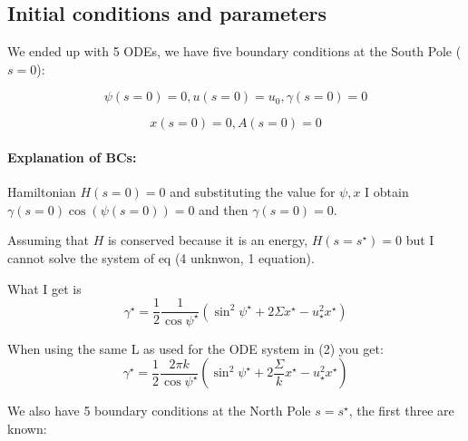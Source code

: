 \documentclass[12pt]{article}
\begin{document}







\subsection{Initial conditions and parameters}
We ended up with 5 ODEs, we have five boundary conditions at the South Pole ($s=0$):


$$
\psi(s=0)=0, u(s=0)=u_0, \gamma(s=0)=0
$$

$$
x(s=0) = 0, A(s=0)=0
$$

\paragraph*{Explanation of BCs:}
Hamiltonian $H(s=0)=0$ and substituting the value for $\psi,x$ I obtain $\gamma(s=0) \cos(\psi(s=0))=0$ and then $\gamma(s=0)=0$. 

Assuming that $H$ is conserved because it is an energy, $H(s=s^\star)=0$ but I cannot solve the system of eq (4 unknwon, 1 equation).

What I get is $$
\gamma^\star=\frac{1}{2} \frac{1}{\cos \psi^\star} \left(\sin ^2 \psi^\star +2 \Sigma x^\star - u_\star^2 x^\star \right)
$$

\alert{When using the same L as used for the ODE system in (2) you get:$$
\gamma^\star=\frac{1}{2} \frac{2\pi k}{\cos \psi^\star} \left(\sin ^2 \psi^\star +2 \frac{\Sigma}{k} x^\star - u_\star^2 x^\star \right)
$$}






We also have 5 boundary conditions at the North Pole $s=s^\star$, the first three are known:
\end{document}
